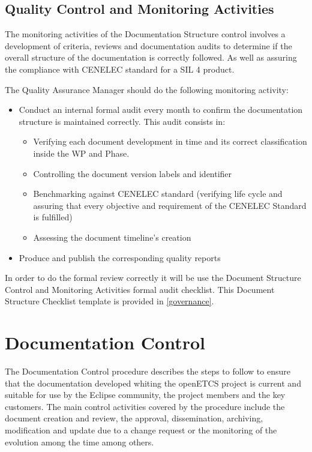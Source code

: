 \documentclass{template/openetcs_article}
\begin{document}
\subsection{Quality Control and Monitoring Activities}
The monitoring activities of the Documentation Structure control involves a development of  criteria, reviews and documentation audits to determine if the overall structure of the documentation is correctly followed. As well as assuring the compliance with CENELEC standard for a SIL 4 product.

The Quality Assurance Manager should do the following monitoring activity:
\begin{itemize}
\item Conduct an internal formal audit every month to confirm the documentation structure is maintained correctly. This audit consists in:
\begin{itemize}
\item Verifying each document development in time and its correct classification inside the WP and Phase.
\item Controlling the document version labels and identifier
\item Benchmarking against CENELEC standard (verifying life cycle and assuring that every objective and requirement of the CENELEC Standard is fulfilled)
\item Assessing the document timeline’s creation
\end{itemize}
\item Produce and publish the corresponding quality reports
\end{itemize}

In order to do the formal review correctly it will be use the Document  Structure Control and Monitoring Activities formal audit checklist. This Document Structure Checklist template is provided in \href{https://github.com/openETCS/governance/tree/master/Templates}{[governance]}.

\section{Documentation Control}
The Documentation Control procedure describes the steps to follow to ensure that the documentation developed whiting the openETCS project is current and suitable for use by the Eclipse community, the project members and the key customers. The main control activities covered by the procedure include the document creation and review, the approval, dissemination, archiving, modification and update due to a change request or the monitoring of the evolution among the time among others.
\end{document}
